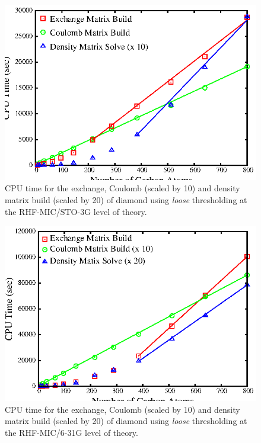 \documentclass[prb,aps,nobibnotes,twocolumn,doublespace,twocolumngrid,superbib]{revtex4}
\begin{document}

\begin{figure}[h]
\caption{CPU time for the exchange, Coulomb (scaled by 10)  and density 
matrix build (scaled by 20) of diamond using {\it loose} thresholding 
at the RHF-MIC/STO-3G level of theory.}
\label{DiamondScaling_1}
{\centering \includegraphics{Timing_Diamond_ONX_1.ps} \par}
\end{figure}

\begin{figure}[h]
\caption{CPU time for the exchange, Coulomb (scaled by 10)  and density 
matrix build (scaled by 20) of diamond using {\it loose} thresholding 
at the RHF-MIC/6-31G\cite{Modified631g} level of theory.}
\label{DiamondScaling_2}
{\centering \includegraphics{Timing_Diamond_ONX_2.ps} \par}
\end{figure}
\end{document}
